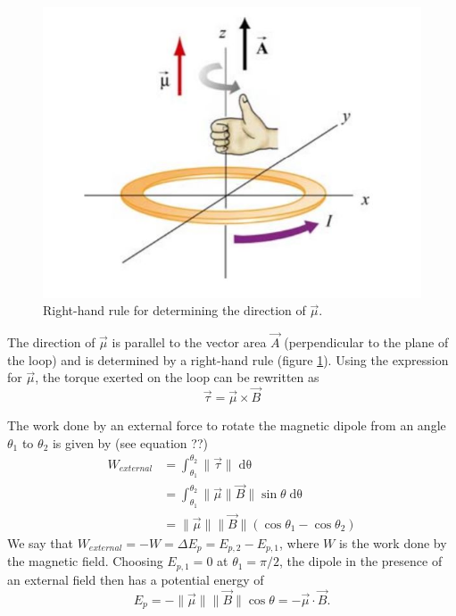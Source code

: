 \begin{figure}[h!]
    \centering
    \includegraphics{notes/images/Magnetic-Fields-Current-Loop-3.JPG}
    \caption{Right-hand rule for determining the direction of $\vec{\mu}$.}
    \label{fig:magnetic-field-current-loop-3}
\end{figure}
\FloatBarrier

The direction of $\vec{\mu}$ is parallel to the vector area $\vec{A}$ (perpendicular to the plane of the loop) and is determined by a right-hand rule (figure \ref{fig:magnetic-field-current-loop-3}). Using the expression for $\vec{\mu}$, the torque exerted on the loop can be rewritten as
\begin{equation}
    \vec{\tau} = \vec{\mu} \times \vec{B}
\end{equation}

The work done by an external force to rotate the magnetic dipole from an angle $\theta_1$ to $\theta_2$ is given by (see equation ??)
\begin{align}
    W_{external} &= \int_{\theta_1}^{\theta_2} \| \vec{ \tau} \| \mathop{\mathrm{d}\theta} \\
    &= \int_{\theta_1}^{\theta_2} \| \vec{\mu} \| \vec{B} \| \sin \theta \mathop{\mathrm{d}\theta} \\
    &= \|\vec{\mu}\|\|\vec{B}\|(\cos \theta_1 - \cos \theta_2)
\end{align}
We say that $W_{external} = -W = \Delta E_p = E_{p,2} - E_{p,1} $, where $W$ is the work done by the magnetic field. Choosing $E_{p,1} = 0$ at $\theta_1 = \pi/2$, the dipole in the presence of an external field then has a potential energy of
\begin{equation}
    E_p = - \| \vec{\mu} \| \| \vec{B} \| \cos \theta = - \vec{\mu} \cdot \vec{B}.
\end{equation}

